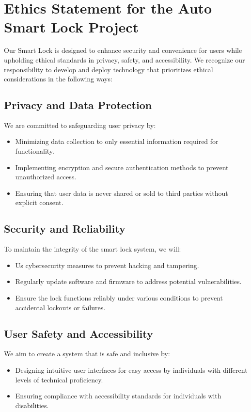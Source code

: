 \section{Ethics Statement for the Auto Smart Lock Project}
Our Smart Lock is designed to enhance security and convenience for users while upholding ethical standards in privacy, safety, and accessibility. We recognize our responsibility to develop and deploy technology that prioritizes ethical considerations in the following ways:

\subsection*{Privacy and Data Protection}
We are committed to safeguarding user privacy by:
\begin{itemize}
    \item Minimizing data collection to only essential information required for functionality.
    \item Implementing encryption and secure authentication methods to prevent unauthorized access.
    \item Ensuring that user data is never shared or sold to third parties without explicit consent.
\end{itemize}

\subsection*{Security and Reliability}
To maintain the integrity of the smart lock system, we will:
\begin{itemize}
    \item Us cybersecurity measures to prevent hacking and tampering.
    \item Regularly update software and firmware to address potential vulnerabilities.
    \item Ensure the lock functions reliably under various conditions to prevent accidental lockouts or failures.
\end{itemize}

\subsection*{User Safety and Accessibility}
We aim to create a system that is safe and inclusive by:
\begin{itemize}
    \item Designing intuitive user interfaces for easy access by individuals with different levels of technical proficiency.
    \item Ensuring compliance with accessibility standards for individuals with disabilities.
\end{itemize}

